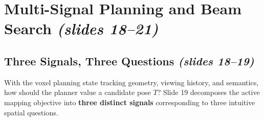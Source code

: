 \documentclass[11pt, a4paper]{article}
\theoremstyle{definition}
\begin{document}
\section{Multi-Signal Planning and Beam Search \emph{(slides 18--21)}}

\subsection{Three Signals, Three Questions \emph{(slides 18--19)}}

With the voxel planning state tracking geometry, viewing history, and semantics, how should the planner value a candidate pose $T$? Slide 19 decomposes the active mapping objective into \textbf{three distinct signals} corresponding to three intuitive spatial questions.
\end{document}

